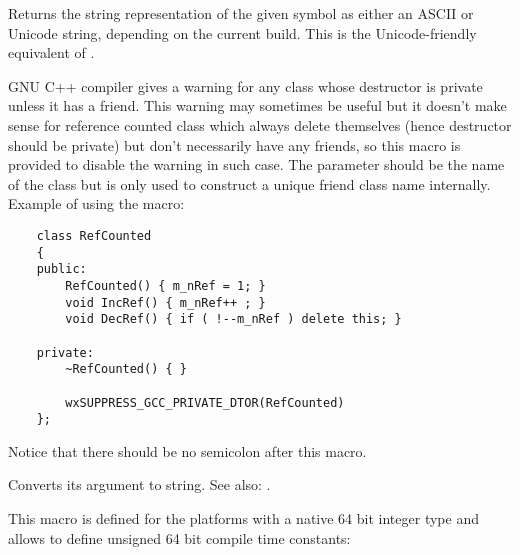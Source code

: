 

\label{wxstringizet}


Returns the string representation of the given symbol as either an ASCII or
Unicode string, depending on the current build. This is the Unicode-friendly
equivalent of .


\label{wxsuppressgccprivatedtorwarning}


GNU C++ compiler gives a warning for any class whose destructor is private
unless it has a friend. This warning may sometimes be useful but it doesn't
make sense for reference counted class which always delete themselves (hence
destructor should be private) but don't necessarily have any friends, so this
macro is provided to disable the warning in such case. The  parameter
should be the name of the class but is only used to construct a unique friend
class name internally. Example of using the macro:

\begin{verbatim}
    class RefCounted
    {
    public:
        RefCounted() { m_nRef = 1; }
        void IncRef() { m_nRef++ ; }
        void DecRef() { if ( !--m_nRef ) delete this; }

    private:
        ~RefCounted() { }

        wxSUPPRESS_GCC_PRIVATE_DTOR(RefCounted)
    };
\end{verbatim}

Notice that there should be no semicolon after this macro.


\label{wxtostring}



Converts its argument to string.
See also: .


\label{wxull}


This macro is defined for the platforms with a native 64 bit integer type and
allows to define unsigned 64 bit compile time constants:

